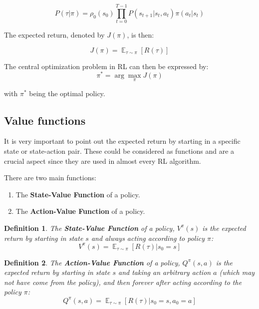 \documentclass{article}
\newtheorem{definition}{Definition}
\DeclareMathOperator*{\E}{\mathbb{E}}
\begin{document}
\begin{equation}
P(\tau|\pi) = \rho_0 (s_0) \prod_{t=0}^{T-1} P(s_{t+1} | s_t, a_t) \pi(a_t | s_t)
\end{equation}


The expected return, denoted by $J(\pi)$, is then:

\begin{equation}
J(\pi) = \E_{\tau\sim \pi}{[R(\tau)]}
\label{eq:loss}
\end{equation}

The central optimization problem in RL can then be expressed by:
\begin{equation}
\pi^* = \arg \max_{\pi} J(\pi)
\label{eq:max_loss}
\end{equation}

with $\pi^*$ being the optimal policy.


\subsection{Value functions}
It is very important to point out the expected return by starting in a specific state or state-action pair. These could be considered as functions and are a crucial aspect since they are used in almost every RL algorithm.

There are two main functions: \cite{silver2015}

\begin{enumerate}
	\item The \textbf{State-Value Function} of a policy.
	
	\item The \textbf{Action-Value Function} of a policy.
	
\end{enumerate}

	
\begin{definition}
	The \textbf{State-Value Function} of a policy, $V^{\pi}(s)$ is the expected return by starting in state $s$ and always acting according to policy $\pi$:
	\begin{equation}
		V^{\pi}(s) = \E_{\tau \sim \pi} [R(\tau)| s_0 = s]
	\end{equation}
\end{definition}

\begin{definition}
	The \textbf{Action-Value Function} of a policy, $Q^{\pi}(s,a)$ is the expected return by starting in state $s$ and taking an arbitrary action $a$ (which may not have come from the policy), and then forever after acting according to the policy $\pi$:
	\begin{equation}
			Q^{\pi}(s,a) = \E_{\tau \sim \pi}[R(\tau)| s_0 = s, a_0 = a]	
	\end{equation}
	
\end{definition}
\end{document}
